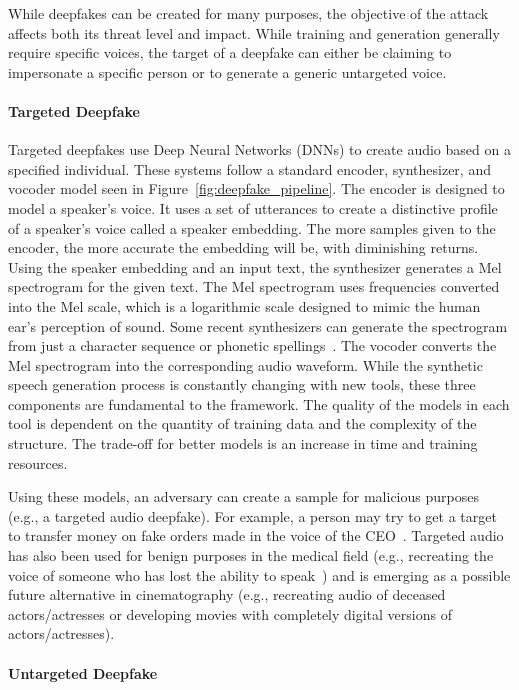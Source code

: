 \documentclass[10pt, journal, anonymous=true]{IEEEtran}
\begin{document}
While deepfakes can be created for many purposes, the objective of the attack affects both its threat level and impact. While training and generation generally require specific voices, the target of a deepfake can either be claiming to impersonate a specific person or to generate a generic untargeted voice. 

\paragraph{Targeted Deepfake} \label{Targeted Individual}

Targeted deepfakes use Deep Neural Networks (DNNs) to create audio based on a specified
individual. These systems follow a standard encoder, synthesizer,
and vocoder model seen in Figure~\ref{fig:deepfake_pipeline}. 
The encoder is designed to model a speaker's voice.
It uses a set of utterances to create a distinctive
profile of a speaker's voice called a speaker embedding. The more samples 
given to the encoder, the more accurate the embedding will be, with
diminishing returns. Using the speaker embedding 
and an input text, the synthesizer generates a Mel spectrogram for the given
text. The Mel spectrogram uses frequencies converted into the Mel scale, which
is a logarithmic scale designed to mimic the human ear's perception of sound.
Some recent synthesizers can generate the spectrogram from just a character
sequence or phonetic spellings~\cite{tacotron}. 
The vocoder converts the Mel spectrogram 
into the corresponding audio waveform. 
While the synthetic speech generation process is constantly changing with new
tools, these three components are fundamental to the framework. 
The quality of
the models in each tool is dependent on the quantity of training data and
the complexity of the structure. 
The trade-off for better models is an increase
in time and training resources. 

Using these models, an adversary can create a sample for malicious purposes
(e.g., a targeted audio deepfake). For example, a
person may 
try to get a target to transfer
money on fake orders made in the voice of the CEO~\cite{theft}.  
Targeted audio has also been used for benign purposes 
in the medical field (e.g., recreating
the voice of someone who has lost the ability to speak~\cite{MBP14}) 
and is
emerging as a possible future alternative in cinematography (e.g., recreating
audio of deceased actors/actresses or developing movies with completely digital
versions of actors/actresses).

\paragraph{Untargeted Deepfake} \label{Untargeted Individual}
\end{document}
